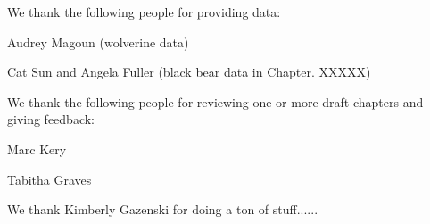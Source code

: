 We thank the following people for providing data:

Audrey Magoun (wolverine data)

Cat Sun and Angela Fuller (black bear data in Chapter. XXXXX)






We thank the following people for reviewing one or more draft chapters
and giving feedback:

Marc Kery

Tabitha Graves



We thank Kimberly Gazenski for doing a ton of stuff......


